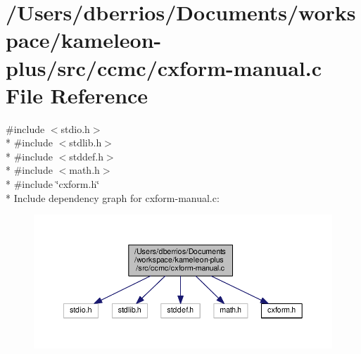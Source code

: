 \hypertarget{cxform-manual_8c}{\section{/\-Users/dberrios/\-Documents/workspace/kameleon-\/plus/src/ccmc/cxform-\/manual.c File Reference}
\label{cxform-manual_8c}
}
{\ttfamily \#include $<$stdio.\-h$>$}\\*
{\ttfamily \#include $<$stdlib.\-h$>$}\\*
{\ttfamily \#include $<$stddef.\-h$>$}\\*
{\ttfamily \#include $<$math.\-h$>$}\\*
{\ttfamily \#include \char`\"{}cxform.\-h\char`\"{}}\\*
Include dependency graph for cxform-\/manual.c\-:
\nopagebreak
\begin{figure}[H]
\begin{center}
\leavevmode
\includegraphics[width=350pt]{cxform-manual_8c__incl}
\end{center}
\end{figure}
